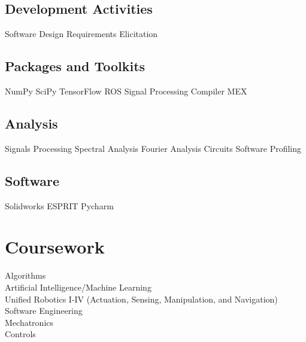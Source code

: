 \documentclass[letterpaper]{deedy-resume} %
\begin{document}
\begin{minipage}[t]{0.33\textwidth}
\subsection{Development Activities}
Software Design \textbullet{} Requirements Elicitation

\subsection{Packages and Toolkits}
NumPy \textbullet{} SciPy \textbullet{} TensorFlow \textbullet{} ROS
Signal Processing \textbullet{} Compiler \textbullet{} MEX

\subsection{Analysis}
Signals Processing \textbullet{} Spectral Analysis \textbullet{} Fourier Analysis \textbullet{} Circuits \textbullet{} Software Profiling

\subsection{Software}
Solidworks \textbullet{} ESPRIT \textbullet{} Pycharm

\sectionspace %


\section{Coursework}

Algorithms \\
Artificial Intelligence/Machine Learning \\
Unified Robotics I-IV (Actuation, Sensing, Manipulation, and Navigation) \\
Software Engineering \\
Mechatronics \\ 
Controls

\sectionspace %


\end{minipage} %
\hfill
%
\end{document}
